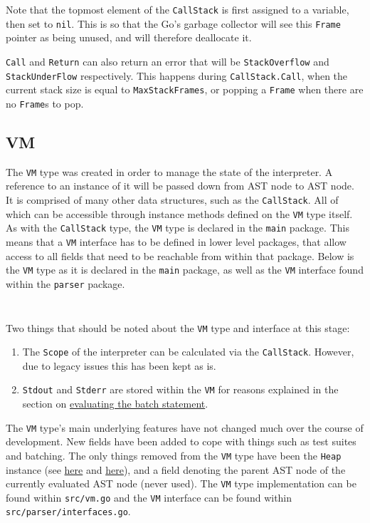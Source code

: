 \inputminted[firstline=140, lastline=151, autogobble, breaklines, tabsize=4]{go}{../../src/call.go}

Note that the topmost element of the \verb|CallStack| is first assigned to a variable, then set to \verb|nil|. This is so that the Go's garbage collector will see this \verb|Frame| pointer as being unused, and will therefore deallocate it.

\verb|Call| and \verb|Return| can also return an error that will be \verb|StackOverflow| and \verb|StackUnderFlow| respectively. This happens during \verb|CallStack.Call|, when the current stack size is equal to \verb|MaxStackFrames|, or popping a \verb|Frame| when there are no \verb|Frame|s to pop.

\subsection{VM}
\label{sec:data-structures-vm}

The \verb|VM| type was created in order to manage the state of the interpreter. A reference to an instance of it will be passed down from AST node to AST node. It is comprised of many other data structures, such as the \verb|CallStack|. All of which can be accessible through instance methods defined on the \verb|VM| type itself. As with the \verb|CallStack| type, the \verb|VM| type is declared in the \verb|main| package. This means that a \verb|VM| interface has to be defined in lower level packages, that allow access to all fields that need to be reachable from within that package. Below is the \verb|VM| type as it is declared in the \verb|main| package, as well as the \verb|VM| interface found within the \verb|parser| package.

\inputminted[firstline=15, lastline=37, autogobble, breaklines, tabsize=4]{go}{../../src/vm.go}

\inputminted[firstline=18, lastline=60, autogobble, breaklines, tabsize=4]{go}{../../src/parser/interfaces.go}

Two things that should be noted about the \verb|VM| type and interface at this stage:

\begin{enumerate}
    \item The \verb|Scope| of the interpreter can be calculated via the \verb|CallStack|. However, due to legacy issues this has been kept as is.
    \item \verb|Stdout| and \verb|Stderr| are stored within the \verb|VM| for reasons explained in the section on \hyperref[sec:eval-ast-nodes-batch]{evaluating the batch statement}.
\end{enumerate}

The \verb|VM| type's main underlying features have not changed much over the course of development. New fields have been added to cope with things such as test suites and batching. The only things removed from the \verb|VM| type have been the \verb|Heap| instance (see \hyperref[sec:data-structures-frames-callstack]{here} and \hyperref[sec:data-structures-heap]{here}), and a field denoting the parent AST node of the currently evaluated AST node (never used). The \verb|VM| type implementation can be found within \verb|src/vm.go| and the \verb|VM| interface can be found within \verb|src/parser/interfaces.go|.
